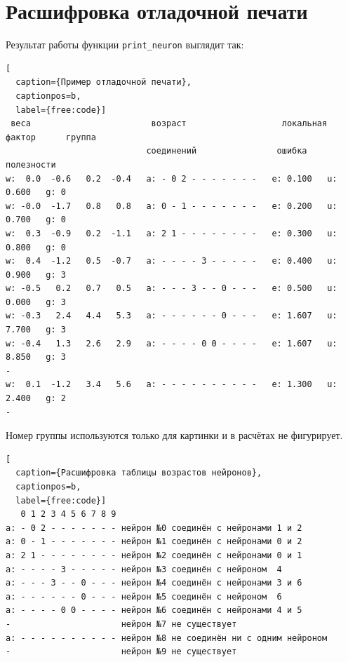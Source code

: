 \documentclass[unicode, 12pt, a4paper,oneside,fleqn]{article}
\begin{document}
\clearpage
\section{Расшифровка отладочной печати}
Результат работы функции \verb'print_neuron' выглядит так:

\begin{lstlisting}[
  caption={Пример отладочной печати},
  captionpos=b,
  label={free:code}]
 веса                        возраст                   локальная   фактор      группа
                            соединений                ошибка      полезности
w:  0.0  -0.6   0.2  -0.4   a: - 0 2 - - - - - - -   e: 0.100   u: 0.600   g: 0
w: -0.0  -1.7   0.8   0.8   a: 0 - 1 - - - - - - -   e: 0.200   u: 0.700   g: 0
w:  0.3  -0.9   0.2  -1.1   a: 2 1 - - - - - - - -   e: 0.300   u: 0.800   g: 0
w:  0.4  -1.2   0.5  -0.7   a: - - - - 3 - - - - -   e: 0.400   u: 0.900   g: 3
w: -0.5   0.2   0.7   0.5   a: - - - 3 - - 0 - - -   e: 0.500   u: 0.000   g: 3
w: -0.3   2.4   4.4   5.3   a: - - - - - - 0 - - -   e: 1.607   u: 7.700   g: 3
w: -0.4   1.3   2.6   2.9   a: - - - - 0 0 - - - -   e: 1.607   u: 8.850   g: 3
-
w:  0.1  -1.2   3.4   5.6   a: - - - - - - - - - -   e: 1.300   u: 2.400   g: 2
-
\end{lstlisting}

Номер группы используются только для картинки и в расчётах не фигурирует.

\begin{lstlisting}[
  caption={Расшифровка таблицы возрастов нейронов},
  captionpos=b,
  label={free:code}]
   0 1 2 3 4 5 6 7 8 9
a: - 0 2 - - - - - - - нейрон №0 соединён с нейронами 1 и 2
a: 0 - 1 - - - - - - - нейрон №1 соединён с нейронами 0 и 2
a: 2 1 - - - - - - - - нейрон №2 соединён с нейронами 0 и 1
a: - - - - 3 - - - - - нейрон №3 соединён с нейроном  4
a: - - - 3 - - 0 - - - нейрон №4 соединён с нейронами 3 и 6
a: - - - - - - 0 - - - нейрон №5 соединён с нейроном  6
a: - - - - 0 0 - - - - нейрон №6 соединён с нейронами 4 и 5
-                      нейрон №7 не существует
a: - - - - - - - - - - нейрон №8 не соединён ни с одним нейроном
-                      нейрон №9 не существует
\end{lstlisting}
\end{document}
